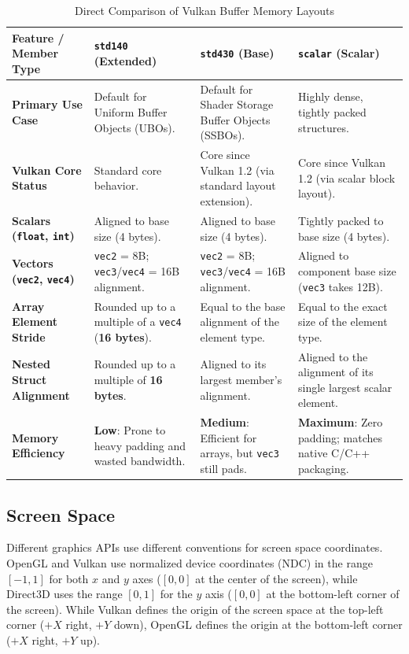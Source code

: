 \begin{table}[htbp]
\centering
\caption{Direct Comparison of Vulkan Buffer Memory Layouts}
\label{tab:memory-layouts}
\begin{tabular}{p{4.4cm} p{3.6cm} p{3.6cm} p{3.6cm}}
\hline
\textbf{Feature / Member Type} & \textbf{\texttt{std140} (Extended)} & \textbf{\texttt{std430} (Base)} & \textbf{\texttt{scalar} (Scalar)} \\ \hline
\textbf{Primary Use Case} & Default for Uniform Buffer Objects (UBOs). & Default for Shader Storage Buffer Objects (SSBOs). & Highly dense, tightly packed structures. \\
\textbf{Vulkan Core Status} & Standard core behavior. & Core since Vulkan 1.2 (via standard layout extension). & Core since Vulkan 1.2 (via scalar block layout). \\
\textbf{Scalars (\texttt{float}, \texttt{int})} & Aligned to base size (4 bytes). & Aligned to base size (4 bytes). & Tightly packed to base size (4 bytes). \\
\textbf{Vectors (\texttt{vec2}, \texttt{vec4})} & \texttt{vec2} = 8B; \texttt{vec3}/\texttt{vec4} = 16B alignment. & \texttt{vec2} = 8B; \texttt{vec3}/\texttt{vec4} = 16B alignment. & Aligned to component base size (\texttt{vec3} takes 12B). \\
\textbf{Array Element Stride} & Rounded up to a multiple of a \texttt{vec4} (\textbf{16 bytes}). & Equal to the base alignment of the element type. & Equal to the exact size of the element type. \\
\textbf{Nested Struct Alignment} & Rounded up to a multiple of \textbf{16 bytes}. & Aligned to its largest member's alignment. & Aligned to the alignment of its single largest scalar element. \\
\textbf{Memory Efficiency} & \textbf{Low}: Prone to heavy padding and wasted bandwidth. & \textbf{Medium}: Efficient for arrays, but \texttt{vec3} still pads. & \textbf{Maximum}: Zero padding; matches native C/C++ packaging. \\ \hline
\end{tabular}
\end{table}






\subsection{Screen Space}\label{subsec:screen-space}

Different graphics APIs use different conventions for screen space coordinates.
OpenGL and Vulkan use normalized device coordinates (NDC) in the range $[-1, 1]$ for both $x$ and $y$ axes
($[0, 0]$ at the center of the screen),
while Direct3D uses the range $[0, 1]$ for the $y$ axis
($[0, 0]$ at the bottom-left corner of the screen).
While Vulkan defines the origin of the screen space at the top-left corner ($+X$ right, $+Y$ down), 
OpenGL defines the origin at the bottom-left corner ($+X$ right, $+Y$ up).


